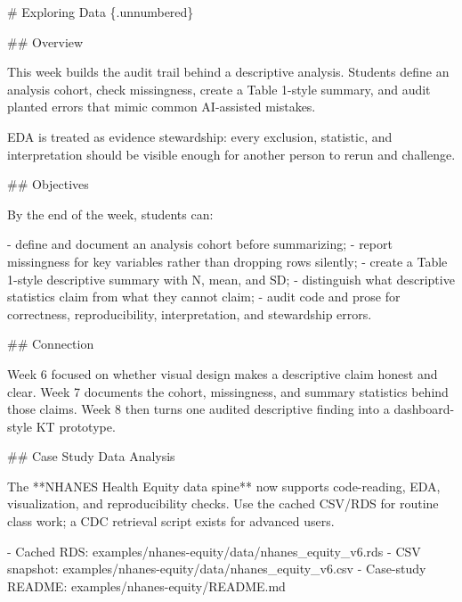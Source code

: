 \documentclass[
  letterpaper,
  DIV=11,
  numbers=noendperiod,
  oneside]{scrreprt}
\newenvironment{Shaded}{\begin{snugshade}}{\end{snugshade}}
\newcommand{\FunctionTok}[1]{\textcolor[rgb]{0.28,0.35,0.67}{#1}}
\newcommand{\InformationTok}[1]{\textcolor[rgb]{0.37,0.37,0.37}{#1}}
\newcommand{\NormalTok}[1]{\textcolor[rgb]{0.00,0.23,0.31}{#1}}
\newcommand{\SpecialStringTok}[1]{\textcolor[rgb]{0.13,0.47,0.30}{#1}}
\begin{document}
\begin{Shaded}
\begin{Highlighting}[numbers=left,,]
\FunctionTok{\# Exploring Data \{.unnumbered\}}


\FunctionTok{\#\# Overview}

\NormalTok{This week builds the audit trail behind a descriptive analysis. Students define an analysis cohort, check missingness, create a Table 1{-}style summary, and audit planted errors that mimic common AI{-}assisted mistakes.}

\NormalTok{EDA is treated as evidence stewardship: every exclusion, statistic, and interpretation should be visible enough for another person to rerun and challenge.}

\FunctionTok{\#\# Objectives}

\NormalTok{By the end of the week, students can:}

\SpecialStringTok{{-} }\NormalTok{define and document an analysis cohort before summarizing;}
\SpecialStringTok{{-} }\NormalTok{report missingness for key variables rather than dropping rows silently;}
\SpecialStringTok{{-} }\NormalTok{create a Table 1{-}style descriptive summary with N, mean, and SD;}
\SpecialStringTok{{-} }\NormalTok{distinguish what descriptive statistics claim from what they cannot claim;}
\SpecialStringTok{{-} }\NormalTok{audit code and prose for correctness, reproducibility, interpretation, and stewardship errors.}

\FunctionTok{\#\# Connection}

\NormalTok{Week 6 focused on whether visual design makes a descriptive claim honest and clear. Week 7 documents the cohort, missingness, and summary statistics behind those claims. Week 8 then turns one audited descriptive finding into a dashboard{-}style KT prototype.}

\FunctionTok{\#\# Case Study Data Analysis}

\NormalTok{The **NHANES Health Equity data spine** now supports code{-}reading, EDA, visualization, and reproducibility checks. Use the cached CSV/RDS for routine class work; a CDC retrieval script exists for advanced users.}

\SpecialStringTok{{-} }\NormalTok{Cached RDS: }\InformationTok{\textasciigrave{}examples/nhanes{-}equity/data/nhanes\_equity\_v6.rds\textasciigrave{}}
\SpecialStringTok{{-} }\NormalTok{CSV snapshot: }\InformationTok{\textasciigrave{}examples/nhanes{-}equity/data/nhanes\_equity\_v6.csv\textasciigrave{}}
\SpecialStringTok{{-} }\NormalTok{Case{-}study README: }\InformationTok{\textasciigrave{}examples/nhanes{-}equity/README.md\textasciigrave{}}


\end{Highlighting}
\end{Shaded}
\end{document}
